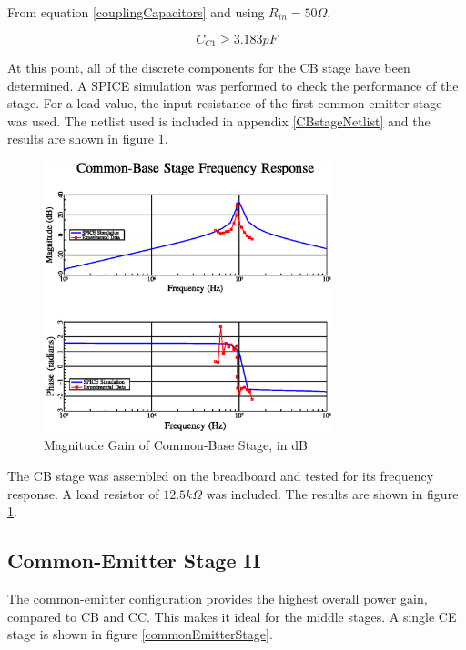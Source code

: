 \documentclass[titlepage, letterpaper, 11pt]{article}
\begin{document}
From equation \ref{couplingCapacitors} and using $R_{in}=50\Omega$,

\begin{equation*}
C_{C1}\geq 3.183pF
\end{equation*}

At this point, all of the discrete components for the CB stage have
been determined. A SPICE simulation was performed to check the
performance of the stage. For a load value, the input resistance of
the first common emitter stage was used. The netlist used is included
in appendix \ref{CBstageNetlist} and the results are shown in figure
\ref{CBstageMagnitudePlot}.

\begin{figure}[ht]
	\centering
	\includegraphics[width=0.75\textwidth]
		{mathGL/cbStage.eps}
	\caption{
		Magnitude Gain of Common-Base Stage, in dB
	}
	\label{CBstageMagnitudePlot}
\end{figure}

The CB stage was assembled on the breadboard and tested for its
frequency response. A load resistor of $12.5k\Omega$ was included.
The results are shown in figure \ref{CBstageMagnitudePlot}.

\subsection{Common-Emitter Stage II}
\label{stage2section}

The common-emitter configuration provides the highest overall power
gain, compared to CB and CC. This makes it ideal for the middle
stages. A single CE stage is shown in figure 
\ref{commonEmitterStage}.
\end{document}
